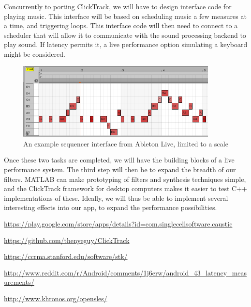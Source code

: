 \documentclass[letterpaper,12pt]{article}
\begin{document}
Concurrently to porting ClickTrack, we will have to design interface code for
playing music. This interface will be based on scheduling music a few measures
at a time, and triggering loops. This interface code will then need to connect
to a scheduler that will allow it to communicate with the sound processing
backend to play sound. If latency permits it, a live performance option
simulating a keyboard might be considered.

\begin{figure}[h]
\centering
\includegraphics[width=0.9\textwidth]{abletonsequencer.png}
\caption{An example sequencer interface from Ableton Live, limited to a scale}
\label{fig:abletonsequencer}
\end{figure}

Once these two tasks are completed, we will have the building blocks of a live
performance system. The third step will then be to expand the breadth of our
filters. MATLAB can make prototyping of filters and synthesis techniques simple,
and the ClickTrack framework for desktop computers makes it easier to test C++
implementations of these. Ideally, we will thus be able to implement several
interesting effects into our app, to expand the performance possibilities.


\begin{thebibliography}{9}
    \singlespacing
    \url{https://play.google.com/store/apps/details?id=com.singlecellsoftware.caustic}

    \url{https://github.com/thenyeguy/ClickTrack}

    \url{https://ccrma.stanford.edu/software/stk/}

    \url{http://www.reddit.com/r/Android/comments/1j6erw/android_43_latency_measurements/}

    \url{http://www.khronos.org/opensles/}

\end{thebibliography}
\end{document}
